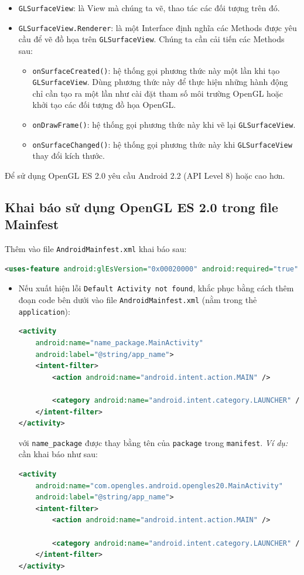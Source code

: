 \documentclass[13pt,a4paper]{extreport}
\begin{document}
	\begin{itemize}
		\item \verb|GLSurfaceView|: là View mà chúng ta vẽ, thao tác các đối tượng trên đó.
		
		\item \verb|GLSurfaceView.Renderer|: là một Interface định nghĩa các Methods được yêu cầu để vẽ đồ họa trên \verb|GLSurfaceView|. Chúng ta cần cải tiến các Methods sau:
			\begin{itemize}
				\item \verb|onSurfaceCreated()|: hệ thống gọi phương thức này một lần khi tạo \verb|GLSurfaceView|. Dùng phương thức này để thực hiện những hành động chỉ cần tạo ra một lần như cài đặt tham số môi trường OpenGL hoặc khởi tạo các đối tượng đồ họa OpenGL.
				
				\item \verb|onDrawFrame()|: hệ thống gọi phương thức này khi vẽ lại \verb|GLSurfaceView|.
				
				\item \verb|onSurfaceChanged()|: hệ thống gọi phương thức này khi \verb|GLSurfaceView| thay đổi kích thước.
			\end{itemize}
	\end{itemize}
	
	Để sử dụng OpenGL ES 2.0 yêu cầu Android 2.2 (API Level 8) hoặc cao hơn.

\subsection{Khai báo sử dụng OpenGL ES 2.0 trong file Mainfest}
	Thêm vào file \verb|AndroidMainfest.xml| khai báo sau:	
		\begin{lstlisting}[language=XML]
<uses-feature android:glEsVersion="0x00020000" android:required="true" />
		\end{lstlisting}
	
	\begin{itemize}
		\item Nếu xuất hiện lỗi \verb|Default Activity not found|, khắc phục bằng cách thêm đoạn code bên dưới vào file \verb|AndroidMainfest.xml| (nằm trong thẻ \verb|application|):
		\begin{lstlisting}[language=XML]
<activity
	android:name="name_package.MainActivity"
	android:label="@string/app_name">
	<intent-filter>
		<action android:name="android.intent.action.MAIN" />

		<category android:name="android.intent.category.LAUNCHER" />
	</intent-filter>
</activity>
		\end{lstlisting}
	với \verb|name_package| được thay bằng tên của \verb|package| trong \verb|manifest|. \emph{Ví dụ:} cần khai báo như sau:
	
		\begin{lstlisting}[language=XML]
<activity
	android:name="com.opengles.android.opengles20.MainActivity"
	android:label="@string/app_name">
	<intent-filter>
		<action android:name="android.intent.action.MAIN" />

		<category android:name="android.intent.category.LAUNCHER" />
	</intent-filter>
</activity>
		\end{lstlisting}
	\end{itemize}
		
\end{document}
